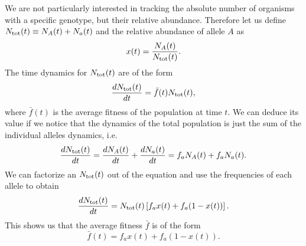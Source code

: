 We are not particularly interested in tracking the absolute number of organisms
with a specific genotype, but their relative abundance. Therefore let us define
$N_{\text{tot}}(t) \equiv N_A(t) + N_a(t)$ and the relative abundance of allele $A$ as
\begin{equation}
  x(t) = {N_A(t) \over N_{\text{tot}}(t)}.
\end{equation}
The time dynamics for $N_{\text{tot}}(t)$ are of the form
\begin{equation}
  {d{N_{\text{tot}}(t)} \over dt} = \bar{f}(t) N_{\text{tot}}(t),
\end{equation}
where $\bar{f}(t)$ is the average fitness of the population at time $t$. We can
deduce its value if we notice that the dynamics of the total population is just
the sum of the individual alleles dynamics, i.e.
\begin{equation}
  {d{N_{\text{tot}}(t)} \over dt} = {d{N_A(t)} \over dt} + {d{N_a(t)} \over dt} = f_a N_A(t) + f_a N_a(t).
\end{equation}
We can factorize an $N_{\text{tot}}(t)$ out of the equation and use the frequencies of
each allele to obtain
\begin{equation}
  {d{N_{\text{tot}}(t)} \over dt} = N_{\text{tot}}(t) \left[ f_a x(t) + f_a (1 - x(t)) \right].
\end{equation}
This shows us that the average fitness $\bar{f}$ is of the form
\begin{equation}
  \bar{f}(t) = f_a x(t) + f_a (1 - x(t)).
\end{equation}

